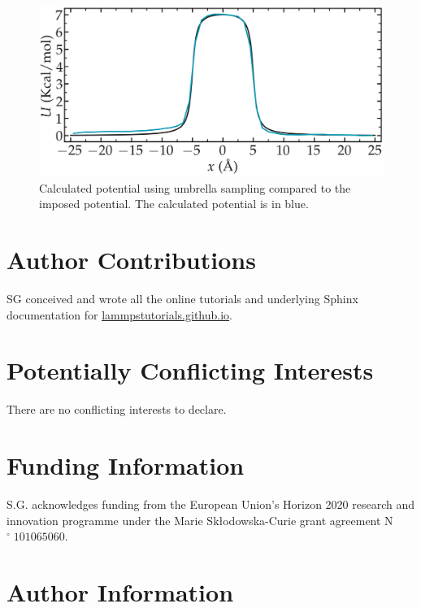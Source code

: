 \documentclass[9pt,tutorial]{livecoms}
\begin{document}
\begin{figure}
\centering
\includegraphics[width=\linewidth]{US-freenergy}
\caption{Calculated potential using umbrella sampling compared to the imposed potential. The calculated potential is in blue.}
\label{fig:US-freenergy}
\end{figure}

\section*{Author Contributions}

SG conceived and wrote all the online tutorials and underlying Sphinx documentation for \href{https://lammpstutorials.github.io}{lammpstutorials.github.io}.

\section*{Potentially Conflicting Interests}

There are no conflicting interests to declare.

\section*{Funding Information}

S.G. acknowledges funding from the European Union's Horizon 2020 research and innovation programme under the Marie Skłodowska-Curie grant agreement N$^\circ\;101065060$.

\section*{Author Information}
\makeorcid




\end{document}
